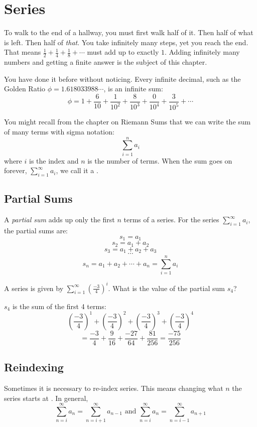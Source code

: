 \chapter{Series}
To walk to the end of a hallway, you must first walk half of it. Then half of
what is left. Then half of \emph{that}. You take infinitely many steps, yet you
reach the end. That means $\frac{1}{2} + \frac{1}{4} + \frac{1}{8} + \cdots$
must add up to exactly $1$. Adding infinitely many numbers and getting a finite
answer is the subject of this chapter.

You have done it before without noticing. Every infinite decimal, such as the
Golden Ratio $\phi = 1.618033988\cdots$, is an infinite sum:
$$\phi = 1 + \frac{6}{10} + \frac{1}{10^2} + \frac{8}{10^3} + 
\frac{0}{10^4} + \frac{3}{10^5} + \cdots$$

You might recall from the chapter on Riemann Sums that we can 
write the sum of many terms with sigma notation:
$$\sum_{i = 1}^n a_i$$
where $i$ is the index and $n$ is the number of terms. When the sum goes on
forever, $\sum_{i=1}^\infty a_i$, we call it a . 

\section{Partial Sums}
A \textit{partial sum} adds up only the first $n$ terms of a series.  For the
series $\sum_{i=1}^{\infty} a_i$, the partial sums are:
$$s_1 = a_1$$
$$s_2 = a_1 + a_2$$
$$s_3 = a_1 + a_2 + a_3$$
$$\cdots$$
$$s_n = a_1 + a_2 + \cdots + a_n = \sum_{i=1}^{n} a_i$$

\begin{Worked}
\begin{Problem}
A series is given by $\sum_{i=1}^\infty 
(\frac{-3}{4})^i$. What is the value of the partial sum $s_4$?
\end{Problem}
\begin{Solution}
$s_4$ is the sum of the first 4 terms: 
$$(\frac{-3}{4})^1 + (\frac{-3}{4})^2 + (\frac{-3}{4})^3 + (\frac{-3}{4})^4$$
$$= \frac{-3}{4} + \frac{9}{16} + \frac{-27}{64} + \frac{81}{256} = 
\frac{-75}{256}$$
\end{Solution}
\end{Worked}

\section{Reindexing}
Sometimes it is necessary to re-index series. This means changing what $n$ the 
series starts at . In general,
$$\sum_{n=i}^\infty a_n = \sum_{n=i + 1}^\infty a_{n-1} \text{ and } \sum_{n=i}^
\infty a_n = \sum_{n=i - 1}^\infty a_{n+1}$$


